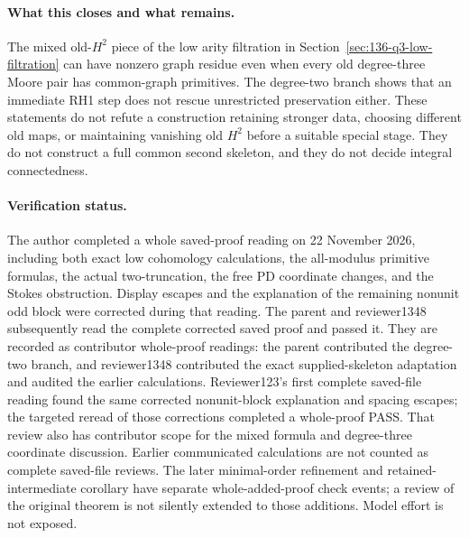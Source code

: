 \paragraph{What this closes and what remains.}
The mixed old-\(H^2\) piece of the low arity filtration
in Section~\ref{sec:136-q3-low-filtration} can have nonzero
graph residue even when every old degree-three Moore pair
has common-graph primitives.  The degree-two branch shows
that an immediate RH1 step does not rescue unrestricted
preservation either.  These statements do not refute a
construction retaining stronger data, choosing different old
maps, or maintaining vanishing old \(H^2\) before a
suitable special stage.  They do not construct a full common
second skeleton, and they do not decide integral connectedness.

\paragraph{Verification status.}
The author completed a whole saved-proof reading on 22 November
2026, including both exact low cohomology calculations, the
all-modulus primitive formulas, the actual two-truncation, the
free PD coordinate changes, and the Stokes obstruction.  Display
escapes and the explanation of the remaining nonunit odd block
were corrected during that reading.  The parent and reviewer1348
subsequently read the complete corrected saved proof and passed it.
They are recorded as contributor whole-proof readings: the parent
contributed the degree-two branch, and reviewer1348 contributed
the exact supplied-skeleton adaptation and audited the earlier
calculations.  Reviewer123's first complete saved-file reading
found the same corrected nonunit-block explanation and spacing
escapes; the targeted reread of those corrections completed a
whole-proof PASS.  That review also has contributor scope for
the mixed formula and degree-three coordinate discussion.
Earlier communicated calculations are not counted
as complete saved-file reviews.  The later minimal-order
refinement and retained-intermediate corollary have separate
whole-added-proof check events; a review of the original theorem
is not silently extended to those additions.  Model effort is
not exposed.

